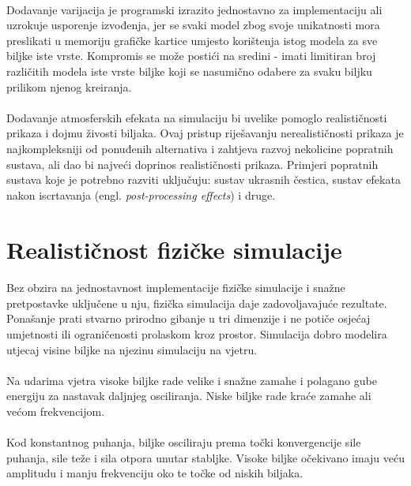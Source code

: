\documentclass[times, utf8, diplomski]{fer}
\begin{document}
\paragraph{}
Dodavanje varijacija je programski izrazito jednostavno za implementaciju ali
uzrokuje usporenje izvođenja, jer se svaki model zbog svoje unikatnosti mora
preslikati u memoriju grafičke kartice umjesto korištenja istog modela za sve 
biljke iste vrste. Kompromis se može postići na sredini - imati limitiran broj 
različitih modela iste vrste biljke koji se nasumično odabere za svaku biljku 
prilikom njenog kreiranja.
\paragraph{}
Dodavanje atmosferskih efekata na simulaciju bi uvelike pomoglo realističnosti
prikaza i dojmu živosti biljaka. Ovaj pristup riješavanju nerealističnosti 
prikaza je najkompleksniji od ponuđenih alternativa i zahtjeva razvoj nekolicine 
popratnih sustava, ali dao bi najveći doprinos realističnosti prikaza. Primjeri 
popratnih sustava koje je potrebno razviti uključuju: sustav ukrasnih čestica, 
sustav efekata nakon iscrtavanja (engl. \textit{post-processing effects}) i 
druge. 

\section{Realističnost fizičke simulacije}
\paragraph{}
Bez obzira na jednostavnost implementacije fizičke simulacije i snažne
pretpostavke uključene u nju, fizička simulacija daje zadovoljavajuće rezultate.
Ponašanje prati stvarno prirodno gibanje u tri dimenzije i ne potiče osjećaj 
umjetnosti ili ograničenosti prolaskom kroz prostor. Simulacija dobro modelira
utjecaj visine biljke na njezinu simulaciju na vjetru. 
\paragraph{}
Na udarima vjetra visoke biljke rade velike i snažne zamahe i polagano gube 
energiju za nastavak daljnjeg osciliranja. Niske biljke rade kraće zamahe ali 
većom frekvencijom.
\paragraph{}
Kod konstantnog puhanja, biljke osciliraju prema točki konvergencije sile 
puhanja, sile teže i sila otpora unutar stabljke. Visoke biljke očekivano imaju veću amplitudu i manju frekvenciju oko te točke od niskih biljaka.
\end{document}
